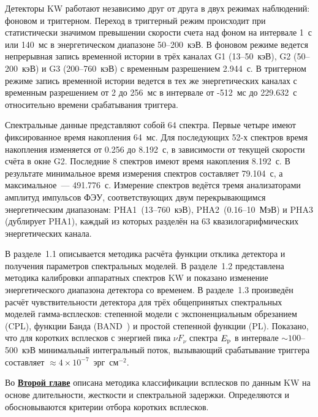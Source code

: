 Детекторы KW работают независимо друг от друга в двух режимах наблюдений: 
фоновом и триггерном. Переход в триггерный режим происходит при статистически 
значимом превышении скорости счета над фоном на интервале 1~с или 140~мс 
в энергетическом диапазоне 50--200~кэВ. В фоновом режиме ведется 
непрерывная запись временной истории в трёх каналах G1 (13--50~кэВ), G2 (50--200~кэВ) 
и G3 (200--760~кэВ) с временным разрешением 2.944~с. В триггерном режиме запись 
временной истории ведется в тех же энергетических каналах с временным разрешением 
от 2 до 256~мс в интервале от -512~мс до 229.632~с относительно времени срабатывания 
триггера.

Спектральные данные представляют собой 64 спектра. Первые четыре имеют фиксированное время накопления 64~мс.
Для последующих 52-х спектров время накопления изменяется от 0.256 до 8.192~с, 
в зависимости от текущей скорости счёта в окне G2. Последние 8 спектров имеют время накопления 8.192~с. 
В результате минимальное время измерения спектров составляет 79.104~с, а максимальное~--- 491.776~с.
Измерение спектров ведётся тремя анализаторами амплитуд импульсов ФЭУ, соответствующих
двум перекрывающимся энергетическим диапазонам:  
PHA1~(13--760~кэВ), PHA2~(0.16--10~МэВ) и PHA3 (дублирует PHA1), каждый из которых 
разделён на 63 квазилогарифмических энергетических канала.

В разделе~1.1 описывается методика расчёта функции отклика детектора и 
получения параметров спектральных моделей. В разделе~1.2 представлена методика калибровки 
аппаратных спектров KW и показано изменение энергетического диапазона детектора со временем.
В разделе~1.3 произведён расчёт чувствительности детектора для трёх общепринятых 
спектральных моделей гамма-всплесков: степенной модели с экспоненциальным обрезанием (CPL),
функции Банда (BAND~\citep{Band_1993ApJ}) и простой степенной функции (PL).
Показано, что для коротких всплесков с энергией пика $\nu F_{\nu}$ 
спектра $E_{\mathrm{p}}$ в интервале
$\sim 100$--500~кэВ минимальный интегральный поток, вызывающий срабатывание триггера
составляет ${\approx 4\times10^{-7}}$~эрг~см$^{-2}$.

Во \underline{\textbf{Второй главе}} описана методика классификации всплесков 
по данным KW на основе длительности, жесткости и спектральной задержки. 
Определяются и обосновываются критерии отбора коротких всплесков.

